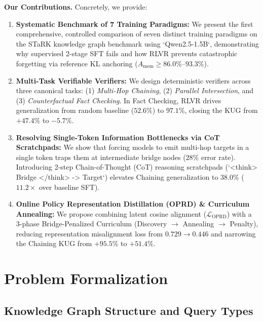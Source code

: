 \documentclass[11pt]{article}
\newcommand{\Amem}{A_{\text{mem}}}
\theoremstyle{definition}
\begin{document}
\noindent\textbf{Our Contributions.} Concretely, we provide:
\begin{enumerate}
    \item[\textbf{C1.}] \textbf{Systematic Benchmark of 7 Training Paradigms:} We present the first comprehensive, controlled comparison of seven distinct training paradigms on the STaRK knowledge graph benchmark \cite{wu2024stark} using `Qwen2.5-1.5B`, demonstrating why supervised 2-stage SFT fails and how RLVR prevents catastrophic forgetting via reference KL anchoring ($\Amem \ge 86.0\%$--$93.3\%$).
    
    \item[\textbf{C2.}] \textbf{Multi-Task Verifiable Verifiers:} We design deterministic verifiers across three canonical tasks: (1) \emph{Multi-Hop Chaining}, (2) \emph{Parallel Intersection}, and (3) \emph{Counterfactual Fact Checking}. In Fact Checking, RLVR drives generalization from random baseline ($52.6\%$) to $\mathbf{97.1\%}$, closing the KUG from $+47.4\%$ to $\mathbf{-5.7\%}$.
    
    \item[\textbf{C3.}] \textbf{Resolving Single-Token Information Bottlenecks via CoT Scratchpads:} We show that forcing models to emit multi-hop targets in a single token traps them at intermediate bridge nodes ($28\%$ error rate). Introducing 2-step Chain-of-Thought (CoT) reasoning scratchpads (`<think> Bridge </think> -> Target`) elevates Chaining generalization to $\mathbf{38.0\%}$ ($11.2\times$ over baseline SFT).
    
    \item[\textbf{C4.}] \textbf{Online Policy Representation Distillation (OPRD) \& Curriculum Annealing:} We propose combining latent cosine alignment ($\mathcal{L}_{\text{OPRD}}$) with a 3-phase Bridge-Penalized Curriculum (Discovery $\to$ Annealing $\to$ Penalty), reducing representation misalignment loss from $0.729 \to 0.446$ and narrowing the Chaining KUG from $+95.5\%$ to $+51.4\%$.
\end{enumerate}

\section{Problem Formalization}\label{sec:problem}

\subsection{Knowledge Graph Structure and Query Types}
\end{document}
